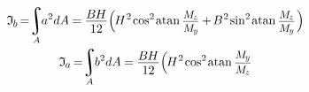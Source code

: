 \documentclass[14pt]{extarticle}
\DeclareMathOperator*{\integral}{\scalerel*{\rotatebox{12}{$\!\textstyle\int\!$}}{\int}} %
\newcommand\cosine{\operatorname{cos}}
\newcommand\sine{\operatorname{sin}}
\newcommand\atan{\operatorname{atan}}
\begin{document}
\[\begin{gathered}
\mathfrak{I}_{\hspace{-0.1ex}\scalebox{.8}{$b$}} \hspace{-0.25ex}
=\hspace{-0.6ex}
\integral_{A} \hspace{-0.7ex} a^2 dA \hspace{-0.1ex}
=\hspace{-0.1ex} \displaystyle\frac{\raisebox{-0.18em}{$B \hspace{-0.1ex} H$}}{12} \Bigl(
\hspace{-0.2ex} H^{\hspace{.1ex}2} \hspace{-.2ex} \cosine^{2} \hspace{-0.22ex} \atan \scalebox{.88}{$ \displaystyle\frac{\raisebox{-0.12em}{$M_{\hspace{-0.1ex}\scalebox{.8}{$z$}}$}}{M_{\hspace{-0.1ex}\scalebox{.8}{$y$}}} $}
\hspace{-0.1ex}+\hspace{-0.25ex}
B^{\hspace{.1ex}2} \hspace{-.2ex} \sine^{2} \hspace{-0.22ex} \atan \scalebox{.88}{$ \displaystyle\frac{\raisebox{-0.12em}{$M_{\hspace{-0.1ex}\scalebox{.8}{$z$}}$}}{M_{\hspace{-0.1ex}\scalebox{.8}{$y$}}} $} \hspace{.2ex}
\Bigr)
\\
\mathfrak{I}_{\hspace{-0.1ex}\scalebox{.8}{$a$}} \hspace{-0.25ex}
=\hspace{-0.6ex}
\integral_{A} \hspace{-0.7ex} b^2 dA \hspace{-0.1ex}
=\hspace{-0.1ex} \displaystyle\frac{\raisebox{-0.18em}{$B \hspace{-0.1ex} H$}}{12} \Bigl(
\hspace{-0.2ex} H^{\hspace{.1ex}2} \hspace{-.2ex} \cosine^{2} \hspace{-0.22ex} \atan \scalebox{.88}{$ \displaystyle\frac{\raisebox{-0.12em}{$M_{\hspace{-0.1ex}\scalebox{.8}{$y$}}$}}{M_{\hspace{-0.1ex}\scalebox{.8}{$z$}}} $}

\end{gathered}\]
\end{document}
